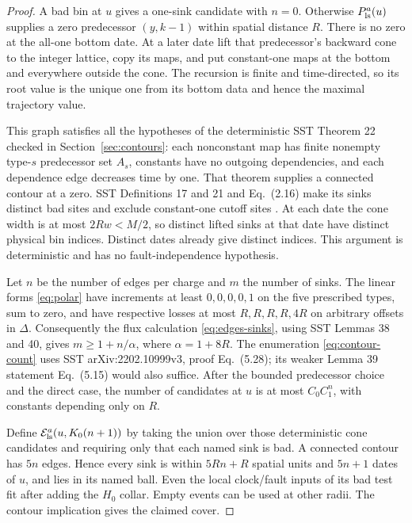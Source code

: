 \begin{proof}
A bad bin at \(u\) gives a one-sink candidate with \(n=0\).
Otherwise \(P_{\rm ls}^a(u)\) supplies a zero predecessor
\((y,k-1)\) within spatial distance \(R\).
There is no zero at the all-one bottom date. At a later date
lift that predecessor's backward cone to the integer lattice,
copy its maps, and put constant-one maps at the bottom and
everywhere outside the cone. The recursion is finite and
time-directed, so its root value is the unique one from its
bottom data and hence the maximal trajectory value.

This graph satisfies all the hypotheses of the deterministic
SST Theorem 22 checked in Section~\ref{sec:contours}: each
nonconstant map has finite nonempty type-\(s\) predecessor
set \(A_s\), constants have no outgoing dependencies, and
each dependence edge decreases time by one. That theorem
supplies a connected contour at a zero. SST Definitions 17
and 21 and Eq.~(2.16) make its sinks distinct bad sites and
exclude constant-one cutoff sites \cite{SST}.
At each date the cone width is at most \(2Rw<M/2\), so
distinct lifted sinks at that date have distinct physical
bin indices. Distinct dates already give distinct indices.
This argument is deterministic and has no fault-independence
hypothesis.

Let \(n\) be the number of edges per charge and \(m\) the
number of sinks. The linear forms \eqref{eq:polar} have
increments at least \(0,0,0,0,1\) on the five prescribed
types, sum to zero, and have respective losses at most
\(R,R,R,R,4R\) on arbitrary offsets in \(\Delta\).
Consequently the flux calculation
\eqref{eq:edges-sinks}, using SST Lemmas 38 and 40, gives
\(m\ge1+n/\alpha\), where \(\alpha=1+8R\).
The enumeration \eqref{eq:contour-count} uses SST
arXiv:2202.10999v3, proof Eq.~(5.28); its weaker Lemma 39
statement Eq.~(5.15) would also suffice.
After the bounded predecessor choice and the direct case,
the number of candidates at \(u\) is at most \(C_0C_1^n\),
with constants depending only on \(R\).

Define \(\mathcal E_{\rm ls}^a(u,K_0(n+1))\) by taking the
union over those deterministic cone candidates and requiring
only that each named sink is bad. A connected contour has
\(5n\) edges. Hence every sink is within \(5Rn+R\) spatial
units and \(5n+1\) dates of \(u\), and lies in its named
ball. Even the local clock/fault inputs of its bad test
fit after adding the \(H_0\) collar. Empty events can be
used at other radii. The contour implication gives the
claimed cover.


\end{proof}

